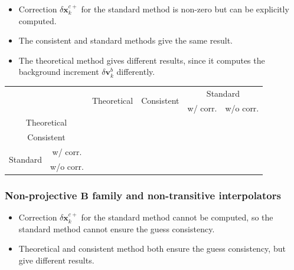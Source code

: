 \documentclass[12pt]{scrartcl}
\newcommand{\cmark}{\ding{51}}%
\newcommand{\xmark}{\ding{55}}%
\begin{document}
\begin{itemize}
\item Correction $\delta \mathbf{x}^{c+}_k$ for the standard method is non-zero but can be explicitly computed.
\item The consistent and standard methods give the same result.
\item The theoretical method gives different results, since it computes the background increment $\delta \mathbf{v}^b_k$ differently.
\end{itemize}

\begin{center}
\begin{adjustbox}{max width=\textwidth}
\begin{tabular}{cc|c|c|c|c}
 & & \multirow{2}{*}{Theoretical} & \multirow{2}{*}{Consistent} & \multicolumn{2}{c}{Standard} \\
& & & & w/ corr.& w/o corr. \\
\hline
\multicolumn{2}{c|}{Theoretical} & \textcolor{green}{\cmark} & \textcolor{red}{\xmark} & \textcolor{red}{\xmark} & \textcolor{red}{\xmark} \\
\hline
\multicolumn{2}{c|}{Consistent} & \textcolor{red}{\xmark} & \textcolor{green}{\cmark} & \textcolor{green}{\cmark} & \textcolor{red}{\xmark} \\
\hline
\multirow{2}{*}{Standard} & w/ corr. & \textcolor{red}{\xmark} & \textcolor{green}{\cmark} & \textcolor{green}{\cmark} & \textcolor{red}{\xmark} \\
\cline{2-6}
 & w/o corr. & \textcolor{red}{\xmark} & \textcolor{red}{\xmark} & \textcolor{red}{\xmark} & \textcolor{green}{\cmark} \\
\hline
\end{tabular}
\end{adjustbox}
\end{center}

\subsubsection{Non-projective $\mathbf{B}$ family and non-transitive interpolators}

\begin{itemize}
\item Correction $\delta \mathbf{x}^{c+}_k$ for the standard method cannot be computed, so the standard method cannot ensure the guess consistency.
\item Theoretical and consistent method both ensure the guess consistency, but give different results.
\end{itemize}
\end{document}
